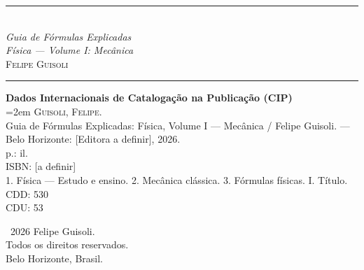 
\thispagestyle{empty}
\vspace*{\fill}

\begin{center}
\rule{0.5\linewidth}{0.4pt}\\[1em]

{\small\itshape Guia de Fórmulas Explicadas\\Física --- Volume I: Mecânica}\\[2em]

{\footnotesize\scshape Felipe Guisoli}\\[1em]

\rule{0.5\linewidth}{0.4pt}
\end{center}

\vspace{2em}

\begin{center}
\begin{minipage}{0.7\linewidth}
\footnotesize
\textbf{Dados Internacionais de Catalogação na Publicação (CIP)}\\[1em]

\hangindent=2em
\textsc{Guisoli, Felipe}.\\
Guia de Fórmulas Explicadas: Física, Volume I --- Mecânica /
Felipe Guisoli. --- Belo Horizonte: [Editora a definir], 2026.\\
[NN] p.: il.\\[0.5em]

ISBN: [a definir]\\[0.5em]

1. Física --- Estudo e ensino. 2. Mecânica clássica. 3. Fórmulas físicas.
I. Título.\\[1em]

\hfill CDD: 530\\
\hfill CDU: 53
\end{minipage}
\end{center}

\vfill

\begin{center}
\footnotesize
\textcopyright\ 2026 Felipe Guisoli.\\
Todos os direitos reservados.\\
Belo Horizonte, Brasil.
\end{center}

\vspace*{\fill}
\clearpage

